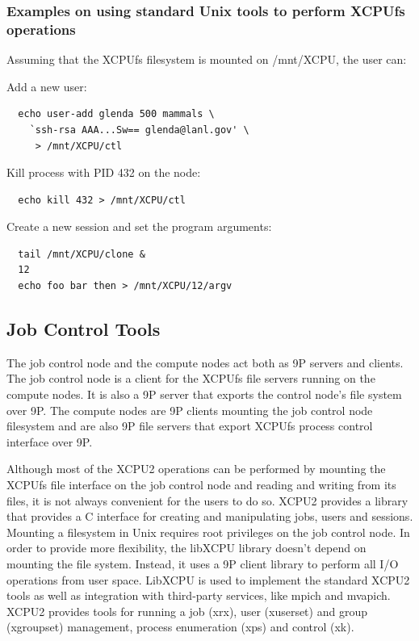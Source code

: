 \documentclass[10pt,conference,letterpaper]{IEEEtran}
\begin{document}
\subsubsection{Examples on using standard Unix tools to perform XCPUfs
operations}

Assuming that the XCPUfs filesystem is mounted on /mnt/XCPU, the user can:

Add a new user:

\begin{verbatim}
  echo user-add glenda 500 mammals \
    `ssh-rsa AAA...Sw== glenda@lanl.gov' \
     > /mnt/XCPU/ctl
\end{verbatim}

Kill process with PID 432 on the node:

\begin{verbatim}
  echo kill 432 > /mnt/XCPU/ctl
\end{verbatim}

Create a new session and set the program arguments:

\begin{verbatim}
  tail /mnt/XCPU/clone &
  12
  echo foo bar then > /mnt/XCPU/12/argv
\end{verbatim}

\subsection{Job Control Tools}

The job control node and the compute nodes act both as 9P servers and
clients. The job control node is a client for the XCPUfs file servers
running on the compute nodes. It is also a 9P server that exports the
control node's file system over 9P. The compute nodes are 9P clients
mounting the job control node filesystem and are also 9P file servers
that export XCPUfs process control interface over 9P.

Although most of the XCPU2 operations can be performed by mounting the
XCPUfs file interface on the job control node and reading and writing from
its files, it is not always convenient for the users to do so. XCPU2
provides a library that provides a C interface for creating and manipulating
jobs, users and sessions. Mounting a filesystem in Unix requires root
privileges on the job control node. In order to provide more flexibility,
the libXCPU library doesn't depend on mounting the file system. Instead, it
uses a 9P client library to perform all I/O operations from user space.
LibXCPU is used to implement the standard XCPU2 tools as well as integration
with third-party services, like mpich and mvapich. XCPU2 provides tools for
running a job (xrx), user (xuserset) and group (xgroupset) management,
process enumeration (xps) and control (xk).
\end{document}
